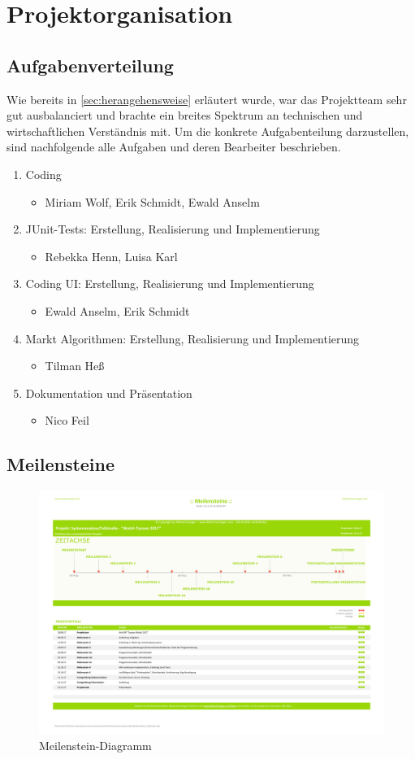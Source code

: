 \clearpage
\chapter{Projektorganisation}
\section{Aufgabenverteilung}
Wie bereits in \ref{sec:herangehensweise} erläutert wurde, war das Projektteam sehr gut ausbalanciert und brachte ein breites Spektrum an technischen und wirtschaftlichen Verständnis mit. Um die konkrete Aufgabenteilung darzustellen, sind nachfolgende alle Aufgaben und deren Bearbeiter beschrieben. 
\begin{enumerate}
	\item Coding
	\begin{itemize}
		\item Miriam Wolf, Erik Schmidt, Ewald Anselm
	\end{itemize} 
	\item JUnit-Tests: Erstellung, Realisierung und Implementierung
	\begin{itemize}
		\item Rebekka Henn, Luisa Karl
	\end{itemize} 
	\item Coding UI: Erstellung, Realisierung und Implementierung
	\begin{itemize}
		\item Ewald Anselm, Erik Schmidt
	\end{itemize} 
	\item Markt Algorithmen: Erstellung, Realisierung und Implementierung
	\begin{itemize}
		\item Tilman Heß
	\end{itemize} 	
	\item Dokumentation und Präsentation
	\begin{itemize}
	\item Nico Feil
	\end{itemize}
\end{enumerate}
\clearpage
\section{Meilensteine}\label{sec:meilenstein}
\begin{figure}[!h]
	\centering
	\includegraphics[angle=90, scale=0.45]{img/Meilensteine_Fallstudie.pdf}
	\caption{Meilenstein-Diagramm} \label{fig:abb34}
\end{figure}
